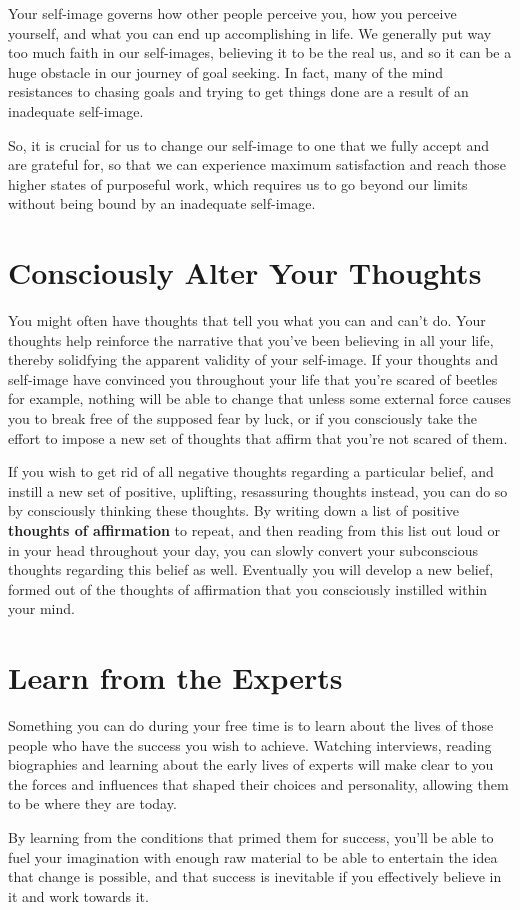 \documentclass[
]{book}
\begin{document}
Your self-image governs how other people perceive you, how you perceive yourself, and what you can end up accomplishing in life. We generally put way too much faith in our self-images, believing it to be the real us, and so it can be a huge obstacle in our journey of goal seeking. In fact, many of the mind resistances to chasing goals and trying to get things done are a result of an inadequate self-image.

So, it is crucial for us to change our self-image to one that we fully accept and are grateful for, so that we can experience maximum satisfaction and reach those higher states of purposeful work, which requires us to go beyond our limits without being bound by an inadequate self-image.

\hypertarget{consciously-alter-your-thoughts}{%
\section{Consciously Alter Your Thoughts}\label{consciously-alter-your-thoughts}}

You might often have thoughts that tell you what you can and can't do. Your thoughts help reinforce the narrative that you've been believing in all your life, thereby solidfying the apparent validity of your self-image. If your thoughts and self-image have convinced you throughout your life that you're scared of beetles for example, nothing will be able to change that unless some external force causes you to break free of the supposed fear by luck, or if you consciously take the effort to impose a new set of thoughts that affirm that you're not scared of them.

If you wish to get rid of all negative thoughts regarding a particular belief, and instill a new set of positive, uplifting, resassuring thoughts instead, you can do so by consciously thinking these thoughts. By writing down a list of positive \textbf{thoughts of affirmation} to repeat, and then reading from this list out loud or in your head throughout your day, you can slowly convert your subconscious thoughts regarding this belief as well. Eventually you will develop a new belief, formed out of the thoughts of affirmation that you consciously instilled within your mind.

\hypertarget{learn-from-the-experts}{%
\section{Learn from the Experts}\label{learn-from-the-experts}}

Something you can do during your free time is to learn about the lives of those people who have the success you wish to achieve. Watching interviews, reading biographies and learning about the early lives of experts will make clear to you the forces and influences that shaped their choices and personality, allowing them to be where they are today.

By learning from the conditions that primed them for success, you'll be able to fuel your imagination with enough raw material to be able to entertain the idea that change is possible, and that success is inevitable if you effectively believe in it and work towards it.

  
\end{document}

